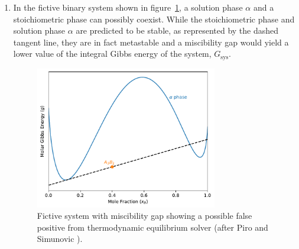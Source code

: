 	\begin{enumerate}
		\item In the fictive binary system shown in figure~\ref{fig:go_sys-AB}, a solution phase $\alpha$ and a stoichiometric phase  can possibly coexist. While the stoichiometric phase  and solution phase $\alpha$ are predicted to be stable, as represented by the dashed tangent line, they are in fact metastable and a miscibility gap would yield a lower value of the integral Gibbs energy of the system, $G_\text{sys}$.
		\begin{figure}[htbp]
		\centering
		\includegraphics[width=0.75\textwidth]{figures/chapter-4/System_AB.pdf}
		\caption{Fictive system with miscibility gap showing a possible false positive from thermodynamic equilibrium solver (after Piro and Simunovic \cite{Piro16}).}
		\label{fig:go_sys-AB}
	\end{figure}


\end{enumerate}
